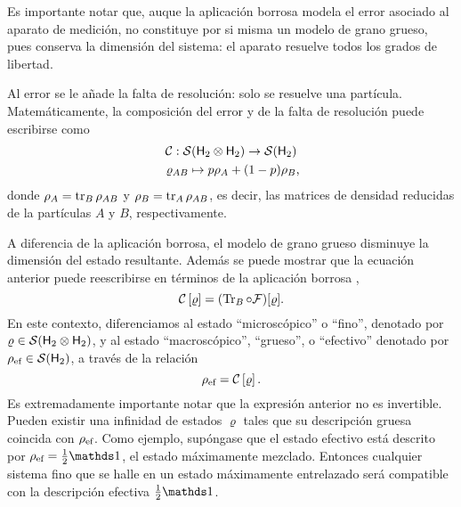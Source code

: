 Es importante notar que, auque la aplicación borrosa modela el error asociado al aparato de medición, no constituye por si misma un modelo de grano grueso, pues conserva la dimensión del sistema: el aparato resuelve todos los grados de libertad.


Al error se le añade la falta de resolución: solo se resuelve una partícula. \acnote{\checkmark} Matemáticamente, la composición del error y de la falta de resolución puede escribirse como
\begin{gather}
    \mcC:\mcS(\hilbert_2 \otimes \hilbert_2)\to \mcS(\hilbert_2)\nonumber\\
    \varrho_{AB} \mapsto p\rho_A+(1-p)\rho_B\rlap{,}\nonumber
\end{gather}
donde $\rho_A=\tr_B \rho_{AB}$ y $\rho_B=\tr_A \rho_{AB}$, es decir, las matrices de densidad reducidas de la partículas $A$ y $B$, respectivamente.


A diferencia de la aplicación borrosa, el modelo de grano grueso disminuye la dimensión del estado resultante. Además se puede mostrar que la ecuación anterior puede reescribirse en términos de la aplicación borrosa \cite{FuzzyMeasurements},
\begin{equation}
\mathcal{C}\left[\varrho\right]=(\Tr_{B}\circ\mathcal{F})[\varrho].\nonumber
\end{equation}
En este contexto, diferenciamos al estado ``microscópico'' o ``fino'', denotado por $\varrho\in \mathcal{S}({\sf H}_2\otimes{\sf H}_2)$, y al estado ``macroscópico'', ``grueso'', o  ``efectivo'' denotado por $\rho_{\text{ef}}\in \mathcal{S}({\sf H}_2)$, a través de la relación
\begin{equation}
    \rho_{\text{ef}}=\mathcal{C}\left[\varrho\right].\nonumber
\end{equation}
Es extremadamente importante notar que la expresión anterior no es invertible. Pueden existir una infinidad de estados $\varrho$ tales que su descripción gruesa coincida con $\rho_{\text{ef}}$. Como ejemplo, supóngase que el estado efectivo está descrito por $\rho_{\ef}=\frac{1}{2}\Id$, el estado máximamente mezclado. Entonces cualquier sistema fino que se halle en un estado máximamente entrelazado será compatible con la descripción efectiva $\frac{1}{2}\Id$.


